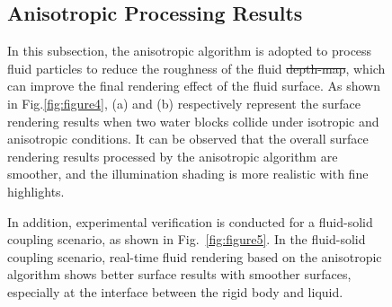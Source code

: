 \documentclass[times,twocolumn,final]{elsarticle}
\providecommand{\DIFaddtex}[1]{{\protect\color{blue}\uwave{#1}}} %
\providecommand{\DIFdeltex}[1]{{\protect\color{red}\sout{#1}}}                      %
\providecommand{\DIFaddbegin}{} %
\providecommand{\DIFaddend}{} %
\providecommand{\DIFdelbegin}{} %
\providecommand{\DIFdelend}{} %
\providecommand{\DIFadd}[1]{\texorpdfstring{\DIFaddtex{#1}}{#1}} %
\providecommand{\DIFdel}[1]{\texorpdfstring{\DIFdeltex{#1}}{}} %
\begin{document}
\begin{figure}[!t]
\DIFaddend \subsection{Anisotropic Processing Results}
In this subsection, the anisotropic algorithm is adopted to process fluid particles to reduce the roughness of the fluid \DIFdelbegin \DIFdel{depth-map}\DIFdelend \DIFaddbegin \DIFadd{depth map}\DIFaddend , which can improve the final rendering effect of the fluid surface. As shown in Fig.\ref{fig:figure4}, (a) and (b) respectively represent the surface rendering results when two water blocks collide under isotropic and anisotropic conditions. It can be observed that the overall surface rendering results processed by the anisotropic algorithm are smoother, and the illumination shading is more realistic with fine highlights.

In addition, experimental verification is conducted for a fluid-solid coupling scenario, as shown in Fig.~\ref{fig:figure5}. In the fluid-solid coupling scenario, real-time fluid rendering based on the anisotropic algorithm shows better surface results with smoother surfaces, especially at the interface between the rigid body and liquid.


\end{figure}
\end{document}
